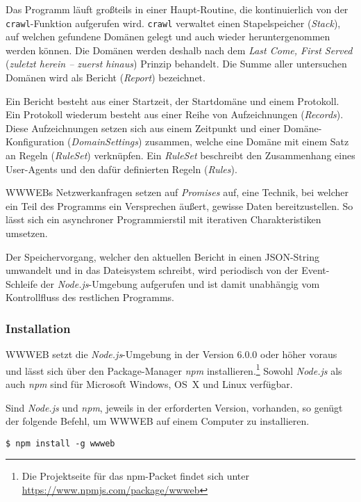 Das Programm läuft großteils in einer Haupt-Routine, die kontinuierlich von der
\texttt{crawl}-Funktion aufgerufen wird. \texttt{crawl} verwaltet einen
Stapelspeicher (\emph{Stack}), auf welchen gefundene Domänen gelegt und auch
wieder heruntergenommen werden können. Die Domänen werden deshalb nach dem
\emph{Last Come, First Served} (\emph{zuletzt herein -- zuerst hinaus}) Prinzip
behandelt. Die Summe aller untersuchen Domänen wird als Bericht (\emph{Report})
bezeichnet.

Ein Bericht besteht aus einer Startzeit, der Startdomäne und einem Protokoll.
Ein Protokoll wiederum besteht aus einer Reihe von Aufzeichnungen
(\emph{Records}). Diese Aufzeichnungen setzen sich aus einem Zeitpunkt und
einer Domäne-Konfiguration (\emph{DomainSettings}) zusammen, welche eine Domäne
mit einem Satz an Regeln (\emph{RuleSet}) verknüpfen. Ein \emph{RuleSet}
beschreibt den Zusammenhang eines User-Agents und den dafür definierten Regeln
(\emph{Rules}).

WWWEBs Netzwerkanfragen setzen auf \emph{Promises} auf, eine Technik, bei
welcher ein Teil des Programms ein Versprechen äußert, gewisse Daten
bereitzustellen. So lässt sich ein asynchroner Programmierstil mit iterativen
Charakteristiken umsetzen.

Der Speichervorgang, welcher den aktuellen Bericht in einen JSON-String
umwandelt und in das Dateisystem schreibt, wird periodisch von der
Event-Schleife der \emph{Node.js}-Umgebung aufgerufen und ist damit unabhängig
vom Kontrollfluss des restlichen Programms.

\subsubsection{Installation}
\label{ssub:wwweb_installation}

WWWEB setzt die \emph{Node.js}-Umgebung in der Version 6.0.0 oder höher voraus
und lässt sich über den Package-Manager \emph{npm} installieren.\footnote{Die
Projektseite für das npm-Packet findet sich unter
\url{https://www.npmjs.com/package/wwweb}} Sowohl \emph{Node.js} als auch
\emph{npm} sind für Microsoft Windows, OS~X und Linux verfügbar.

Sind \emph{Node.js} und \emph{npm}, jeweils in der erforderten Version,
vorhanden, so genügt der folgende Befehl, um WWWEB auf einem Computer zu
installieren.

\begin{lstlisting}[language=shell]
$ npm install -g wwweb
\end{lstlisting}

